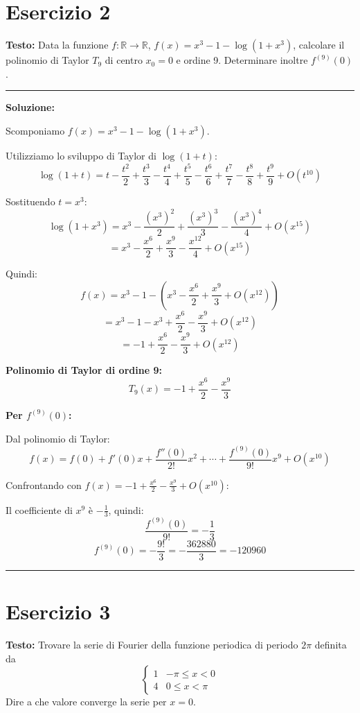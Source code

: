 \documentclass[12pt, a4paper]{article}
\newenvironment{solution}
{\par\noindent\rule{\textwidth}{0.4pt}\par\textbf{Soluzione:}\medskip\par}
{\par\rule{\textwidth}{0.4pt}\par\bigskip}
\begin{document}
\newpage

\section*{Esercizio 2}

\textbf{Testo:} Data la funzione $f: \mathbb{R} \rightarrow \mathbb{R}$, $f(x) = x^{3} - 1 - \log(1+x^{3})$, calcolare il polinomio di Taylor $T_{9}$ di centro $x_{0}=0$ e ordine 9. Determinare inoltre $f^{(9)}(0)$.

\begin{solution}
Scomponiamo $f(x) = x^3 - 1 - \log(1+x^3)$.

Utilizziamo lo sviluppo di Taylor di $\log(1+t)$:
\[
\log(1+t) = t - \frac{t^2}{2} + \frac{t^3}{3} - \frac{t^4}{4} + \frac{t^5}{5} - \frac{t^6}{6} + \frac{t^7}{7} - \frac{t^8}{8} + \frac{t^9}{9} + O(t^{10})
\]

Sostituendo $t = x^3$:
\[
\log(1+x^3) = x^3 - \frac{(x^3)^2}{2} + \frac{(x^3)^3}{3} - \frac{(x^3)^4}{4} + O(x^{15})
\]
\[
= x^3 - \frac{x^6}{2} + \frac{x^9}{3} - \frac{x^{12}}{4} + O(x^{15})
\]

Quindi:
\[
f(x) = x^3 - 1 - \left(x^3 - \frac{x^6}{2} + \frac{x^9}{3} + O(x^{12})\right)
\]
\[
= x^3 - 1 - x^3 + \frac{x^6}{2} - \frac{x^9}{3} + O(x^{12})
\]
\[
= -1 + \frac{x^6}{2} - \frac{x^9}{3} + O(x^{12})
\]

\textbf{Polinomio di Taylor di ordine 9:}
\[
T_9(x) = -1 + \frac{x^6}{2} - \frac{x^9}{3}
\]

\textbf{Per $f^{(9)}(0)$:}

Dal polinomio di Taylor:
\[
f(x) = f(0) + f'(0)x + \frac{f''(0)}{2!}x^2 + \cdots + \frac{f^{(9)}(0)}{9!}x^9 + O(x^{10})
\]

Confrontando con $f(x) = -1 + \frac{x^6}{2} - \frac{x^9}{3} + O(x^{10})$:

Il coefficiente di $x^9$ è $-\frac{1}{3}$, quindi:
\[
\frac{f^{(9)}(0)}{9!} = -\frac{1}{3}
\]
\[
f^{(9)}(0) = -\frac{9!}{3} = -\frac{362880}{3} = -120960
\]
\end{solution}

\newpage

\section*{Esercizio 3}

\textbf{Testo:} Trovare la serie di Fourier della funzione periodica di periodo $2\pi$ definita da
\[ \begin{cases} 1 & -\pi \le x < 0 \\ 4 & 0 \le x < \pi \end{cases} \]
Dire a che valore converge la serie per $x=0$.
\end{document}
